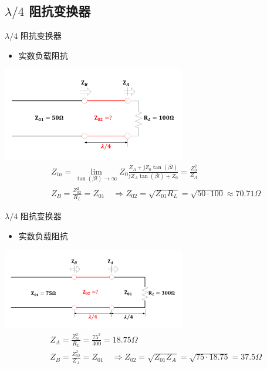 \subsection{$\lambda/4$ 阻抗变换器}
\begin{frame}{$\lambda/4$ 阻抗变换器}
  \begin{itemize}
    \item 实数负载阻抗
  \end{itemize}
  \centering
  \includegraphics[width=8cm]{Cha4//fig4-27.pdf}
  \begin{align*}
     & Z_{in}=\lim_{\tan(\beta l)\to\infty}Z_0\frac{Z_A+\mathrm{j}Z_0\tan(\beta l)}{\mathrm{j}Z_A\tan(\beta l)+Z_0}=\frac{Z_0^2}{Z_A} \\
     & Z_B=\frac{Z_{02}^2}{R_L}=Z_{01}\quad \Rightarrow Z_{02}=\sqrt{Z_{01}R_L}=\sqrt{50\cdot 100}\approx 70.71\Omega
  \end{align*}
\end{frame}

\begin{frame}{$\lambda/4$ 阻抗变换器}
  \begin{itemize}
    \item 实数负载阻抗
  \end{itemize}
  \centering
  \includegraphics[width=8cm]{Cha4//fig4-28.pdf}
  \begin{align*}
     & Z_A=\frac{Z_{01}^2}{R_L}=\frac{75^2}{300}=18.75\Omega                                                    \\
     & Z_B=\frac{Z_{02}^2}{Z_A}=Z_{01}\quad \Rightarrow Z_{02}=\sqrt{Z_{01}Z_A}=\sqrt{75\cdot 18.75}=37.5\Omega
  \end{align*}
\end{frame}

